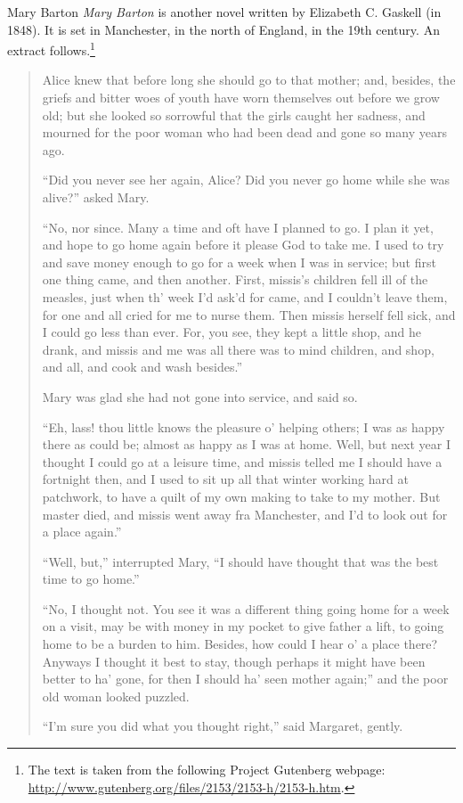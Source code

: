\begin{texts}{Mary Barton}
\textit{Mary Barton} is another novel written by Elizabeth C. Gaskell (in 1848). It is set in Manchester, in the north of England, in the 19th century. An extract follows.\footnote{The text is taken from the following Project Gutenberg webpage: \url{http://www.gutenberg.org/files/2153/2153-h/2153-h.htm}.}

\begin{quote}
    \internallinenumbers*{}
    Alice knew that before long she should go to that mother; and, besides, the griefs and bitter woes of youth have worn themselves out before we grow old; but she looked so sorrowful that the girls caught her sadness, and mourned for the poor woman who had been dead and gone so many years ago.
    
    ``Did you never see her again, Alice? Did you never go home while she was alive?'' asked Mary.
    
    ``No, nor since. Many a time and oft have I planned to go. I plan it yet, and hope to go home again before it please God to take me. I used to try and save money enough to go for a week when I was in service; but first one thing came, and then another. First, missis's children fell ill of the measles, just when th' week I'd ask'd for came, and I couldn't leave them, for one and all cried for me to nurse them. Then missis herself fell sick, and I could go less than ever. For, you see, they kept a little shop, and he drank, and missis and me was all there was to mind children, and shop, and all, and cook and wash besides.''
    
    Mary was glad she had not gone into service, and said so.
    
    ``Eh, lass! thou little knows the pleasure o' helping others; I was as happy there as could be; almost as happy as I was at home. Well, but next year I thought I could go at a leisure time, and missis telled me I should have a fortnight then, and I used to sit up all that winter working hard at patchwork, to have a quilt of my own making to take to my mother. But master died, and missis went away fra Manchester, and I'd to look out for a place again.''
    
    ``Well, but,'' interrupted Mary, ``I should have thought that was the best time to go home.''
    
    ``No, I thought not. You see it was a different thing going home for a week on a visit, may be with money in my pocket to give father a lift, to going home to be a burden to him. Besides, how could I hear o' a place there? Anyways I thought it best to stay, though perhaps it might have been better to ha' gone, for then I should ha' seen mother again;'' and the poor old woman looked puzzled.
    
    ``I'm sure you did what you thought right,'' said Margaret, gently.
\end{quote}


\end{texts}

